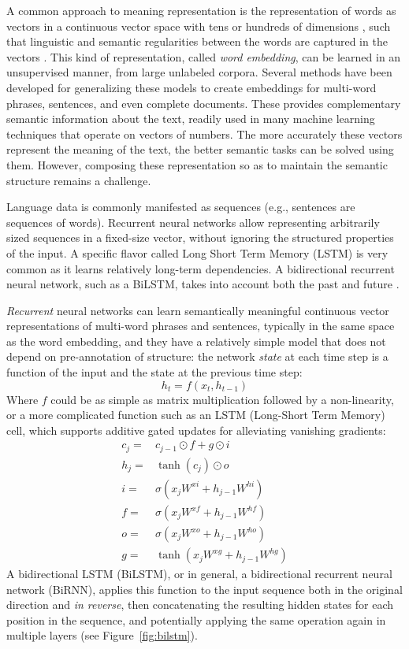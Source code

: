 \documentclass[12pt,a4paper,table]{report}
\renewcommand\cite{\citep}      %
\begin{document}
A common approach to meaning representation is the
representation of words as vectors in a continuous vector space with tens or
hundreds of dimensions \cite{turian2010word}, such that linguistic and semantic
regularities between the words are captured in the
vectors \cite{mikolov2013linguistic}. This kind of representation, called
\textit{word embedding}, can be learned in an unsupervised manner, from large
unlabeled corpora.
Several methods have been developed for generalizing these models to create embeddings
for multi-word phrases, sentences, and even complete documents.
These provides complementary semantic information about the text,
readily used in many machine learning techniques that operate on vectors of numbers.
The more accurately these vectors represent the meaning of the text, the better semantic tasks
can be solved using them.
However, composing these representation so as to maintain the semantic structure remains a challenge.

Language data is commonly manifested as sequences
(e.g., sentences are sequences of words).
Recurrent neural networks \citep{elman1990finding} allow representing
arbitrarily sized sequences in a fixed-size vector,
without ignoring the structured properties of the input.
A specific flavor called Long Short Term Memory
(LSTM) is very common as it learns relatively long-term dependencies.
A bidirectional recurrent neural network, such as a BiLSTM,
takes into account both the past and future
\cite{hochreiter1997long,schuster1997bidirectional,graves2008supervised,irsoy2014opinion}.

\textit{Recurrent} neural networks can learn semantically meaningful
continuous vector representations of multi-word phrases and sentences,
typically in the same space as the word embedding, and they have a relatively
simple model that does not depend on pre-annotation of structure:
the network \textit{state} at each time step is a function of the input and
the state at the previous time step:
\[
  h_t=f(x_t,h_{t-1})
\]
Where $f$ could be as simple as matrix multiplication followed by a non-linearity,
or a more complicated function such as an LSTM (Long-Short Term Memory) cell,
which supports additive gated updates for alleviating vanishing gradients:
\begin{align*}
    c_j =& c_{j-1} \odot f  + g\odot i \\
    h_j =& \tanh(c_j) \odot o            \\
    i =& \sigma(x_jW^{xi} + h_{j-1}W^{hi}) \\
    f =& \sigma(x_jW^{xf} + h_{j-1}W^{hf}) \\
    o =& \sigma(x_jW^{xo} + h_{j-1}W^{ho}) \\
    g =& \tanh(x_jW^{xg} + h_{j-1}W^{hg})
\end{align*}
A bidirectional LSTM (BiLSTM), or in general, a bidirectional recurrent neural network (BiRNN),
applies this function to the input sequence both in the original direction and
\textit{in reverse}, then concatenating the resulting hidden states for each position
in the sequence, and potentially applying the same operation again in multiple layers
(see Figure~\ref{fig:bilstm}).
\end{document}
